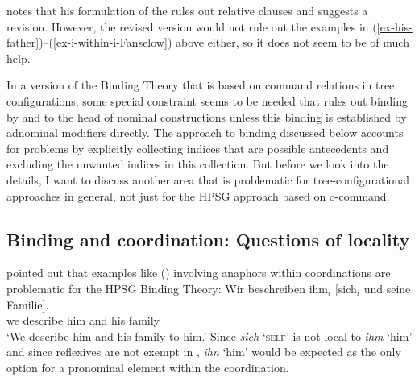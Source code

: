 \documentclass[output=paper,biblatex,babelshorthands,newtxmath,draftmode,colorlinks,citecolor=brown]{langscibook}
\begin{document}
\citet[, Fn.\,63]{Chomsky81a} notes that his formulation of the \iwithinic rules out relative
clauses and suggests a revision. However, the revised version would not rule out the examples in (\ref{ex-his-father})--(\ref{ex-i-within-i-Fanselow})
above either, so it does not seem to be of much help.

In a version of the Binding Theory that is based on command relations in tree configurations, some
special constraint seems to be needed that rules out binding by and to the head of nominal 
constructions unless this binding is established by adnominal modifiers directly. The approach to
binding discussed below accounts for \iwithini problems by explicitly collecting
indices that are possible antecedents and excluding the unwanted indices in this collection. But
before we look into the details, I want to discuss another area that is problematic for
tree-configurational approaches in general, not just for the HPSG approach based on o-command.





\subsection{Binding and coordination: Questions of locality}
\label{binding:sec-locality}


\citet[Section~20.4.7]{Mueller99a} pointed out that examples like () involving anaphors
within coordinations are problematic for the HPSG Binding Theory:
\ea
\label{ex-sich-und-seine-familie}
\gll Wir beschreiben ihm$_{i}$ [sich$_{i}$       und seine Familie].\\
     we describe     him      \spacebr{}\self{} and his family\\
\glt `We describe him and his family to him.'
\z
Since \emph{sich} `\textsc{self}' is not local to \emph{ihm} `him' and since reflexives are not exempt in 
\citep[--159]{Kiss2012a}, \emph{ihn} `him' would be expected as the only option for a pronominal element within
the coordination.
\end{document}
